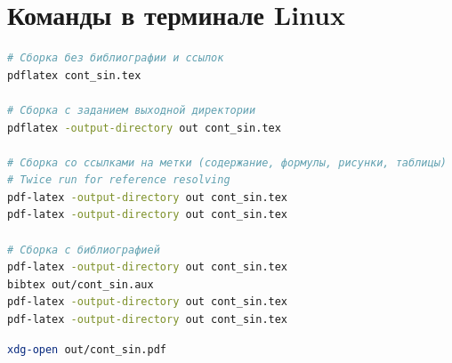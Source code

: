 %

\chapter{Команды в терминале Linux}

\begin{lstlisting}[caption={Сборка проекта}, language=bash]
# Cборка без библиографии и ссылок
pdflatex cont_sin.tex

# Cборка с заданием выходной директории
pdflatex -output-directory out cont_sin.tex

# Cборка со ссылками на метки (содержание, формулы, рисунки, таблицы)
# Twice run for reference resolving
pdf-latex -output-directory out cont_sin.tex
pdf-latex -output-directory out cont_sin.tex

# Сборка с библиографией
pdf-latex -output-directory out cont_sin.tex
bibtex out/cont_sin.aux
pdf-latex -output-directory out cont_sin.tex
pdf-latex -output-directory out cont_sin.tex
\end{lstlisting}

\begin{lstlisting}[caption={Открытие pdf файла в терминале}, language=bash]
xdg-open out/cont_sin.pdf
\end{lstlisting}

%
